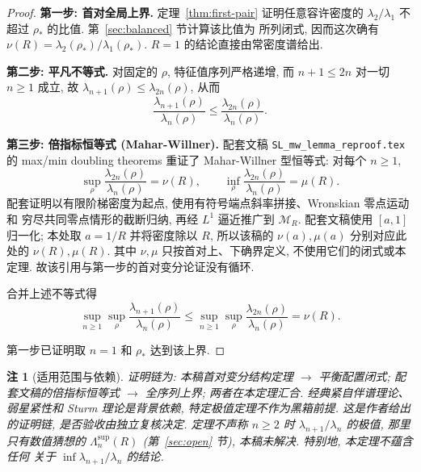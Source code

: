\documentclass[UTF8]{ctexart}
\newtheorem{remark}[theorem]{注}
\begin{document}
\begin{proof}
\textbf{第一步: 首对全局上界.} 定理~\ref{thm:first-pair} 证明任意容许密度的
$\lambda_2/\lambda_1$ 不超过 $\rho_*$ 的比值. 第~\ref{sec:balanced} 节计算该比值为
所列闭式, 因而这次确有 $\nu(R)=\lambda_2(\rho_*)/\lambda_1(\rho_*)$.
$R=1$ 的结论直接由常密度谱给出.

\textbf{第二步: 平凡不等式.} 对固定的 $\rho$, 特征值序列严格递增, 而 $n + 1 \leq 2n$
对一切 $n \geq 1$ 成立, 故 $\lambda_{n+1}(\rho) \leq \lambda_{2n}(\rho)$, 从而
\begin{equation}
	\frac{\lambda_{n+1}(\rho)}{\lambda_n(\rho)} \leq \frac{\lambda_{2n}(\rho)}{\lambda_n(\rho)} .
\end{equation}

\textbf{第三步: 倍指标恒等式 (Mahar-Willner).} 配套文稿
\texttt{SL\_mw\_lemma\_reproof.tex} 的 max/min doubling theorems 重证了
Mahar-Willner 型恒等式: 对每个 $n\geq1$,
\begin{equation}
	\sup_{\rho} \frac{\lambda_{2n}(\rho)}{\lambda_n(\rho)} = \nu(R),
	\qquad
	\inf_{\rho} \frac{\lambda_{2n}(\rho)}{\lambda_n(\rho)} = \mu(R).
\end{equation}
配套证明以有限阶梯密度为起点, 使用有符号端点斜率拼接、Wronskian 零点运动和
穷尽共同零点情形的截断归纳, 再经 $L^1$ 逼近推广到 $\mathcal M_R$.
配套文稿使用 $[a,1]$ 归一化; 本处取 $a=1/R$ 并将密度除以 $R$,
所以该稿的 $\nu(a),\mu(a)$ 分别对应此处的 $\nu(R),\mu(R)$.
其中 $\nu,\mu$ 只按首对上、下确界定义, 不使用它们的闭式或本定理.
故该引用与第一步的首对变分论证没有循环.

合并上述不等式得
\begin{equation}
	\sup_{n \geq 1} \sup_{\rho} \frac{\lambda_{n+1}(\rho)}{\lambda_n(\rho)}
	\leq \sup_{n \geq 1} \sup_{\rho} \frac{\lambda_{2n}(\rho)}{\lambda_n(\rho)}
	= \nu(R).
\end{equation}

第一步已证明取 $n=1$ 和 $\rho_*$ 达到该上界.
\end{proof}

\begin{remark}[适用范围与依赖]
证明链为: 本稿首对变分结构定理 $\to$ 平衡配置闭式;
配套文稿的倍指标恒等式 $\to$ 全序列上界; 两者在本定理汇合.
经典紧自伴谱理论、弱星紧性和 Sturm 理论是背景依赖, 特定极值定理不作为黑箱前提.
这是作者给出的证明链, 是否验收由独立复核决定.
定理不声称 $n \geq 2$ 时 $\lambda_{n+1}/\lambda_n$ 的极值, 那里只有数值猜想的
$\Lambda_n^{\sup}(R)$ (第~\ref{sec:open} 节), 本稿未解决. 特别地, 本定理不蕴含任何
关于 $\inf \lambda_{n+1}/\lambda_n$ 的结论.
\end{remark}
\end{document}
